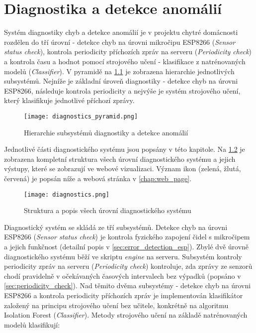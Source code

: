 \chapter{Diagnostika a detekce anomálií} \label{chap:diagnostics}
Systém diagnostiky chyb a detekce anomálií je v projektu chytré domácnosti rozdělen do tří úrovní - detekce chyb na úrovni mikročipu ESP8266 (\textit{Sensor status check}), kontrola periodicity příchozích zpráv na serveru (\textit{Periodicity check}) a kontrola času a hodnot pomocí strojového učení - klasifikace z natrénovaných modelů (\textit{Classifier}). V pyramidě na \cref{fig:diagnostics_pyramid} je zobrazena hierarchie jednotlivých subsystémů. Nejníže je základní úroveň diagnostiky - detekce chyb na úrovni ESP8266, následuje kontrola periodicity a nejvýše je systém strojového učení, který klasifikuje jednotlivé příchozí zprávy.  

\begin{figure}[H]
  \centering
  \texttt{[image: diagnostics\_pyramid.png]}
  \caption{Hierarchie subsystémů diagnostiky a detekce anomálií}
  \label{fig:diagnostics_pyramid}
\end{figure}  

Jednotlivé části diagnostického systému jsou popsány v této kapitole. Na \cref{fig:diagnostics} je zobrazena kompletní struktura všech úrovní diagnostického systému a jejich výstupy, které se zobrazují ve webové vizualizaci. Význam ikon (zelená, žlutá, červená) je popsán níže a webová stránka v \cref{chap:web_page}. 

\begin{figure}[H]
  \centering
  \texttt{[image: diagnostics.png]}
  \caption{Struktura a popis všech úrovní diagnostického systému}
  \label{fig:diagnostics}
\end{figure}  

Diagnostický systém se skládá ze tří subsystémů. Detekce chyb na úrovni ESP8266 (\textit{Sensor status check}) je kontrola fyzického zapojení čidel s mikročipem a jejich funkčnost (detailní popis v \cref{sec:error_detection_esp}). Zbylé dvě úrovně diagnostického systému běží ve skriptu \textit{engine} na serveru. Subsystém kontroly periodicity zpráv na serveru (\textit{Periodicity check}) kontroluje, zda zprávy ze senzorů chodí pravidelně v očekávaných časových intervalech bez výpadků (popsáno v \cref{sec:periodicity_check}). Nad těmito dvěma subsystémy - detekce chyb na úrovni ESP8266 a kontrola periodicity příchozích zpráv je implementován klasifikátor založený na principu strojového učení bez učitele, konkrétně na algoritmu Isolation Forest (\textit{Classifier}). Metody strojového učení na základě natrénovaných modelů klasifikují:

